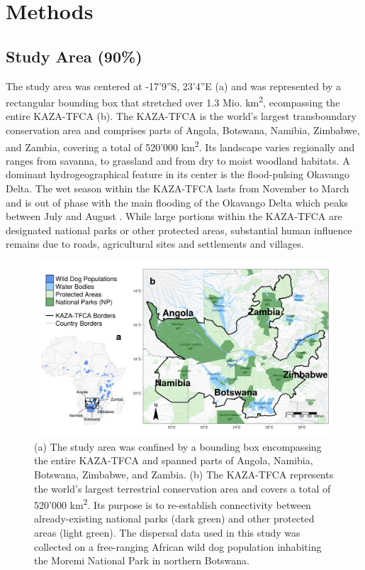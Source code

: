 \documentclass[abstract=on,10pt,a4paper,bibliography=totocnumbered]{article}
\begin{document}
\section{Methods}
\subsection{Study Area (90\%)}
The study area was centered at -17'9''S, 23'4''E
(a) and was represented by a rectangular bounding box that
stretched over 1.3 Mio. km\textsuperscript{2}, ecompassing the entire KAZA-TFCA
(b). The KAZA-TFCA is the world's largest transboundary
conservation area and comprises parts of Angola, Botswana, Namibia, Zimbabwe,
and Zambia, covering a total of 520'000 km\textsuperscript{2}. Its landscape
varies regionally and ranges from savanna, to grassland and from dry to moist
woodland habitats. A dominant hydrogeographical feature in its center is the
flood-pulsing Okavango Delta. The wet season within the KAZA-TFCA lasts from
November to March and is out of phase with the main flooding of the Okavango
Delta which peaks between July and August \citep{McNutt.1996, Wolski.2017}.
While large portions within the KAZA-TFCA are designated national parks or other
protected areas, substantial human influence remains due to roads, agricultural
sites and settlements and villages.

\begin{figure}[htbp]
  \begin{center}
    \includegraphics[width = \textwidth]{99_StudyArea.png}
    \caption{(a) The study area was confined by a bounding box encompassing the
    entire KAZA-TFCA and spanned parts of Angola, Namibia, Botswana, Zimbabwe,
    and Zambia. (b) The KAZA-TFCA represents the world's largest terrestrial
    conservation area and covers a total of 520'000 km\textsuperscript{2}. Its
    purpose is to re-establish connectivity between already-existing national
    parks (dark green) and other protected areas (light green). The dispersal
    data used in this study was collected on a free-ranging African wild dog
    population inhabiting the Moremi National Park in northern Botswana.}
    \label{StudyArea}
  \end{center}
\end{figure}
\end{document}
